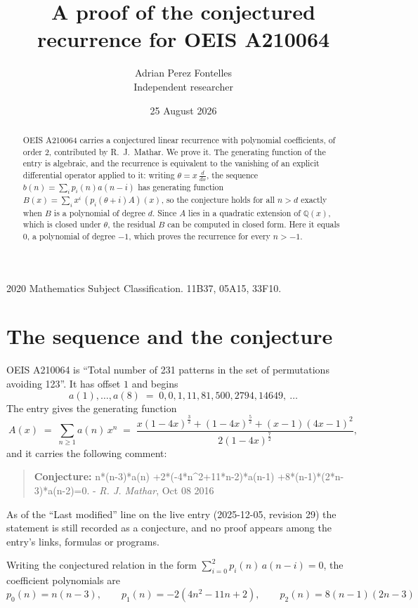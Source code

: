 \documentclass[11pt,a4paper]{article}
\title{A proof of the conjectured recurrence for OEIS A210064}
\author{Adrian Perez Fontelles\\ \small Independent researcher}
\date{25 August 2026}
\theoremstyle{plain}
\theoremstyle{definition}
\begin{document}
\maketitle

\begin{abstract}
OEIS A210064 carries a conjectured linear recurrence with polynomial coefficients, of
order 2, contributed by R.~J.~Mathar. We prove it. The generating function of the
entry is algebraic, and the recurrence is equivalent to the vanishing of an explicit
differential operator applied to it: writing $\theta=x\,\frac{d}{dx}$, the sequence
$b(n)=\sum_{i}p_{i}(n)a(n-i)$ has generating function
$B(x)=\sum_{i}x^{i}\,(p_{i}(\theta+i)A)(x)$, so the conjecture holds for all $n>d$ exactly
when $B$ is a polynomial of degree $d$. Since $A$ lies in a quadratic extension of
$\mathbb{Q}(x)$, which is closed under $\theta$, the residual $B$ can be computed in
closed form. Here it equals $0$, a polynomial of degree $-1$, which proves
the recurrence for every $n>-1$.
\end{abstract}

\noindent\small 2020 Mathematics Subject Classification. 11B37, 05A15, 33F10.\normalsize

\section{The sequence and the conjecture}

OEIS A210064 is ``Total number of 231 patterns in the set of permutations avoiding 123''. It has offset $1$ and begins
\[
a(1),\dots,a(8)\;=\;0, 0, 1, 11, 81, 500, 2794, 14649,\ \dots
\]
The entry gives the generating function
\begin{equation}\label{eq:gf}
A(x)\;=\;\sum_{n\ge 1} a(n)\,x^{n}\;=\;\frac{x \left(1 - 4 x\right)^{\frac{3}{2}} + \left(1 - 4 x\right)^{\frac{5}{2}} + \left(x - 1\right) \left(4 x - 1\right)^{2}}{2 \left(1 - 4 x\right)^{\frac{7}{2}}} ,
\end{equation}
and it carries the following comment:
\begin{quote}\small
\textbf{Conjecture:} n*(n-3)*a(n) +2*(-4*n\^{}2+11*n-2)*a(n-1) +8*(n-1)*(2*n-3)*a(n-2)=0. - \emph{R. J. Mathar}, Oct 08 2016
\end{quote}
As of the ``Last modified'' line on the live entry (2025-12-05, revision 29) the
statement is still recorded as a conjecture, and no proof appears among the entry's links,
formulas or programs.

Writing the conjectured relation in the form $\sum_{i=0}^{2}p_{i}(n)\,a(n-i)=0$,
the coefficient polynomials are
\[
p_{0}(n)=n \left(n - 3\right),\qquad p_{1}(n)=- 2 \left(4 n^{2} - 11 n + 2\right),\qquad p_{2}(n)=8 \left(n - 1\right) \left(2 n - 3\right)
\]
\end{document}
